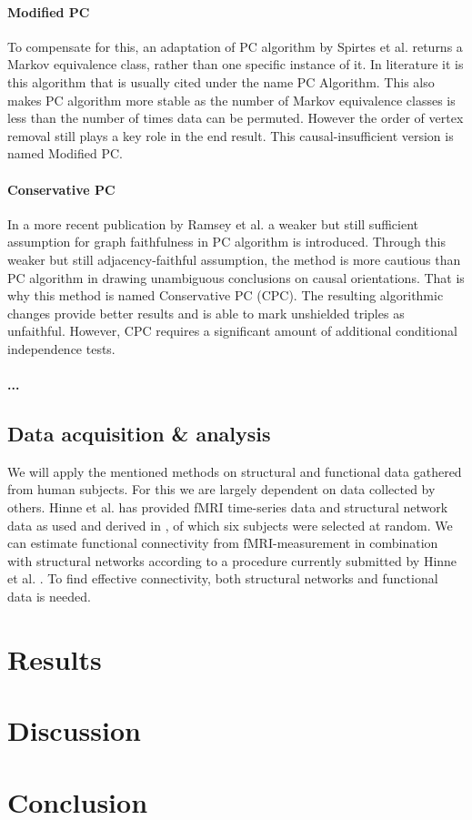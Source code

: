 \documentclass[a4paper, 10pt, english, twocolumn]{article}
\begin{document}
\paragraph{Modified PC}
To compensate for this, an adaptation of PC algorithm by Spirtes et al. returns a Markov equivalence class, rather than one specific instance of it.
In literature it is this algorithm that is usually cited under the name PC Algorithm.
This also makes PC algorithm more stable as the number of Markov equivalence classes is less than the number of times data can be permuted.
However the order of vertex removal still plays a key role in the end result.
This causal-insufficient version is named Modified PC.

\paragraph{Conservative PC}
In a more recent publication by Ramsey et al. \cite{ramsey2012} a weaker but still sufficient assumption for graph faithfulness in PC algorithm is introduced.
Through this weaker but still adjacency-faithful assumption, the method is more cautious than PC algorithm in drawing unambiguous conclusions on causal orientations.
That is why this method is named Conservative PC (CPC).
The resulting algorithmic changes provide better results and is able to mark unshielded triples as unfaithful.
However, CPC requires a significant amount of additional conditional independence tests.

\paragraph{...}



\subsection*{Data acquisition \& analysis}
We will apply the mentioned methods on structural and functional data gathered from human subjects.
For this we are largely dependent on data collected by others.
Hinne et al. has provided fMRI time-series data and structural network data as used and derived in \cite{hinne2013}, of which six subjects were selected at random.
We can estimate functional connectivity from fMRI-measurement in combination with structural 
networks according to a procedure currently submitted by Hinne et al. \cite{hinne2013submitted}.
To find effective connectivity, both structural networks and functional data is needed.


\section{Results}

\section{Discussion}

\section{Conclusion}

{}

\end{document}
